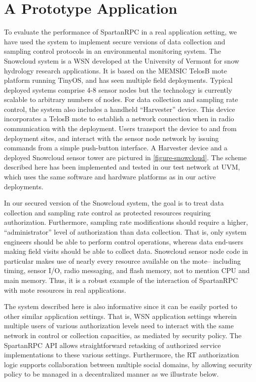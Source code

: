 \section{A Prototype Application}
\label{section-snowcloud}

To evaluate the performance of SpartanRPC in a real application
setting, we have used the system to implement secure versions of data
collection and sampling control protocols in an environmental
monitoring system. The Snowcloud system
\cite{frolik-skalka-snowcloudtr,moeser-walker-skalka-frolik-wsc11} is
a WSN developed at the University of Vermont for snow hydrology
research applications.  It is based on the MEMSIC TelosB mote platform
running TinyOS, and has seen multiple field deployments. Typical
deployed systems comprise 4-8 sensor nodes but the technology is
currently scalable to arbitrary numbers of nodes. For data collection
and sampling rate control, the system also includes a handheld
``Harvester'' device.  This device incorporates a TelosB mote to
establish a network connection when in radio communication with the
deployment.  Users transport the device to and from deployment sites,
and interact with the sensor node network by issuing commands from a
simple push-button interface. A Harvester device and a deployed
Snowcloud sensor tower are pictured in \autoref{figure-snowcloud}. The
scheme described here has been implemented and tested in our test
network at UVM, which uses the same software and hardware platforms as
in our active deployments.

\snowcloudfig

In our secured version of the Snowcloud system, the goal is to treat
data collection and sampling rate control as protected resources
requiring authorization. Furthermore, sampling rate modifications
should require a higher, ``administrator'' level of authorization than
data collection. That is, only system engineers should be able to
perform control operations, whereas data end-users making field visits
should be able to collect data.  Snowcloud sensor node code in
particular makes use of nearly every resource available on the mote--
including timing, sensor I/O, radio messaging, and flash memory, not
to mention CPU and main memory. Thus, it is a robust example of the
interaction of SpartanRPC with mote resources in real applications.

The system described here is also informative since it can be easily
ported to other similar application settings. That is, WSN application
settings wherein multiple users of various authorization levels need
to interact with the same network in control or collection capacities,
as mediated by security policy. The SpartanRPC API allows
straightforward retasking of authorized service implementations to
these various settings. Furthermore, the RT authorization logic
supports collaboration between multiple social domains, by allowing
security policy to be managed in a decentralized manner as we
illustrate below.

